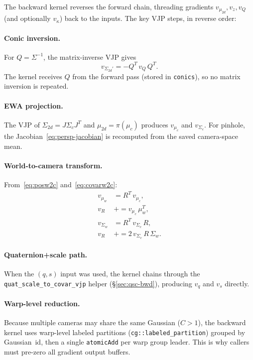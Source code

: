 \documentclass[11pt]{article}
\begin{document}
The backward kernel reverses the forward chain, threading gradients
$v_{\mu_{2d}}, v_z, v_Q$ (and optionally $v_\kappa$) back to the
inputs. The key VJP steps, in reverse order:

\paragraph{Conic inversion.}
For $Q = \Sigma^{-1}$, the matrix-inverse VJP gives
\begin{equation}
  v_{\Sigma_{2d}'} = -Q^T\, v_Q\, Q^T.
  \label{eq:inv-vjp}
\end{equation}
The kernel receives $Q$ from the forward pass (stored in
\texttt{conics}), so no matrix inversion is repeated.

\paragraph{EWA projection.}
The VJP of $\Sigma_{2d} = J \Sigma_c J^T$ and
$\mu_{2d} = \pi(\mu_c)$ produces $v_{\mu_c}$ and $v_{\Sigma_c}$.
For pinhole, the Jacobian~\eqref{eq:persp-jacobian} is
recomputed from the saved camera-space mean.

\paragraph{World-to-camera transform.}
From~\eqref{eq:posw2c} and~\eqref{eq:covarw2c}:
\begin{align}
  v_{\mu_w} &= R^T\, v_{\mu_c}, \\
  v_R &+= v_{\mu_c}\, \mu_w^T, \\
  v_{\Sigma_w} &= R^T\, v_{\Sigma_c}\, R, \\
  v_R &+= 2\, v_{\Sigma_c}\, R\, \Sigma_w.
  \label{eq:covar-vjp}
\end{align}

\paragraph{Quaternion+scale path.}
When the $(q,s)$ input was used, the kernel chains through the
\texttt{quat\_scale\_to\_covar\_vjp} helper (\S\ref{sec:qsc-bwd}),
producing $v_q$ and $v_s$ directly.

\paragraph{Warp-level reduction.}
Because multiple cameras may share the same Gaussian ($C > 1$), the
backward kernel uses warp-level labeled partitions
(\texttt{cg::labeled\_partition}) grouped by Gaussian~id, then a
single \texttt{atomicAdd} per warp group leader. This is why callers
must pre-zero all gradient output buffers.
\end{document}
